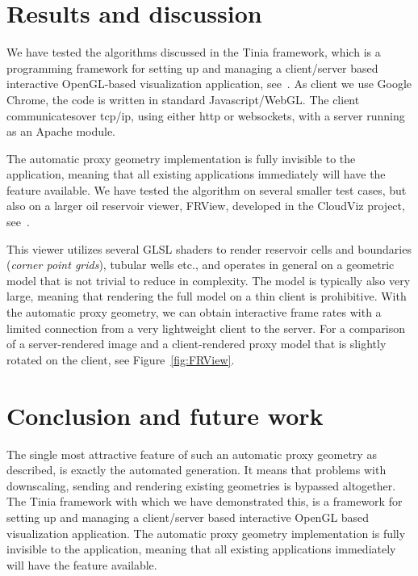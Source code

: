 \section{Results and discussion}

We have tested the algorithms discussed in the Tinia framework, which is a
programming framework for setting up and managing a client/server based
interactive OpenGL-based visualization application, see~\cite{tinia}. As client
we use Google Chrome, the code is written in standard Javascript/WebGL.
The client communicatesover tcp/ip, using either http or
websockets, with a server running as an Apache module.

The automatic proxy geometry implementation is fully invisible to the
application, meaning that all existing applications immediately will have the
feature available. We have tested the algorithm on several smaller test cases,
but also on a larger oil reservoir viewer, FRView, developed in the CloudViz
project, see~\cite{cloudviz}.

This viewer utilizes several GLSL shaders to render reservoir cells and
boundaries ({\em corner point grids}), tubular wells etc., and operates in
general on a geometric model that is not trivial to reduce in complexity. The
model is typically also very large, meaning that rendering the full model on a
thin client is prohibitive. With the automatic proxy geometry, we can obtain
interactive frame rates with a limited connection from a very lightweight client
to the server. For a comparison of a server-rendered image and a client-rendered
proxy model that is slightly rotated on the client, see Figure~\ref{fig:FRView}.


\section{Conclusion and future work}

The single most attractive feature of such an automatic proxy geometry as
described, is exactly the automated generation. It means that problems with
downscaling, sending and rendering existing geometries is bypassed
altogether. The Tinia framework with which we have demonstrated this, is a
framework for setting up and managing a client/server based interactive OpenGL
based visualization application. The automatic proxy geometry implementation is
fully invisible to the application, meaning that all existing applications
immediately will have the feature available.

